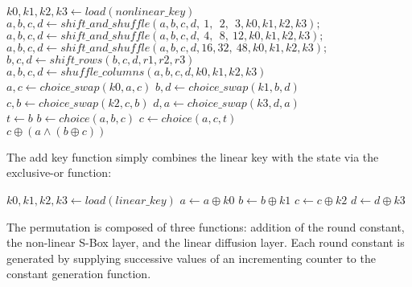 \documentclass[preprint]{iacrtrans}
\begin{document}
\begin{algorithmic}
	\State $k0, k1, k2, k3 \gets load(nonlinear\_key)$
		\State $a, b, c, d \gets shift\_and\_shuffle(a, b, c, d, \ 1,\ \ 2,\ \ 3, k0, k1, k2, k3);$
		\State $a, b, c, d \gets shift\_and\_shuffle(a, b, c, d, \ 4,\ \ 8,\ 12, k0, k1, k2, k3);$
		\State $a, b, c, d \gets shift\_and\_shuffle(a, b, c, d, 16, 32,\ 48, k0, k1, k2, k3);$
	\EndFor
\EndFunction\\

	\State $b, c, d \gets shift\_rows(b, c, d, r1, r2, r3)$
	\State $a, b, c, d \gets shuffle\_columns(a, b, c, d, k0, k1, k2, k3)$
\EndFunction\\

	\State $a, c \gets choice\_swap(k0, a, c)$
	\State $b, d \gets choice\_swap(k1, b, d)$
	\State $c, b \gets choice\_swap(k2, c, b)$
	\State $d, a \gets choice\_swap(k3, d, a)$
\EndFunction\\

	\State $t \gets b$
	\State $b \gets choice(a, b, c)$
	\State $c \gets choice(a, c, t)$
\EndFunction\\

	\State $c \oplus (a \land (b \oplus c))$
\EndFunction\\
\end{algorithmic}

The add key function simply combines the linear key with the state via the exclusive-or function:\\

\begin{algorithmic}
	\State $k0, k1, k2, k3 \gets load(linear\_key)$
	\State $a \gets a \oplus k0$
	\State $b \gets b \oplus k1$
	\State $c \gets c \oplus k2$
	\State $d \gets d \oplus k3$
\EndFunction
\end{algorithmic}



The permutation is composed of three functions: addition of the round constant, the non-linear S-Box layer, and the linear diffusion layer. Each round constant is generated by supplying successive values of an incrementing counter to the constant generation function.
\end{document}
